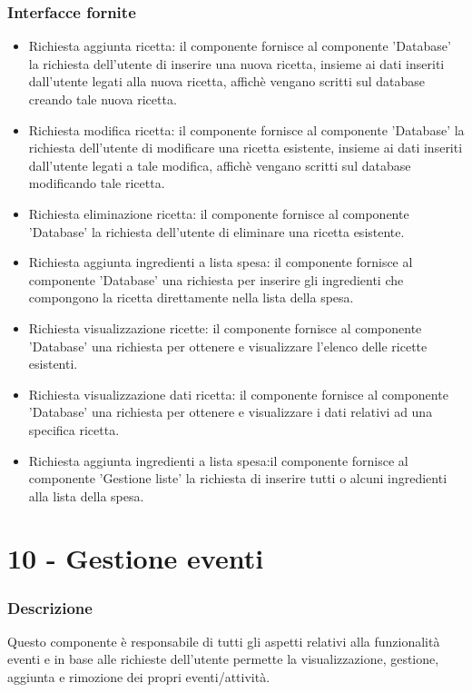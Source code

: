 \documentclass[a4paper,12pt]{article}
\begin{document}
\subsubsection*{Interfacce fornite}
\begin{itemize} \setlength\itemsep{0.01em}
\item {\sffamily Richiesta aggiunta ricetta}: il componente fornisce al componente 'Database' la richiesta dell'utente di inserire una nuova ricetta, insieme ai dati inseriti dall'utente legati alla nuova ricetta, affichè vengano scritti sul database creando tale nuova ricetta.
\item {\sffamily Richiesta modifica ricetta}: il componente fornisce al componente 'Database'  la richiesta dell'utente di modificare una ricetta esistente, insieme ai dati inseriti dall'utente legati a tale modifica, affichè vengano scritti sul database modificando tale ricetta.
\item {\sffamily Richiesta eliminazione ricetta}: il componente fornisce al componente 'Database'  la richiesta dell'utente di eliminare una ricetta esistente.
\item {\sffamily Richiesta aggiunta ingredienti a lista spesa}: il componente fornisce al componente 'Database' una richiesta per inserire gli ingredienti che compongono la ricetta direttamente nella lista della spesa.
\item {\sffamily Richiesta visualizzazione ricette}: il componente fornisce al componente 'Database' una richiesta per ottenere e visualizzare l'elenco delle ricette esistenti.
\item {\sffamily Richiesta visualizzazione dati ricetta}: il componente fornisce al componente 'Database' una richiesta per ottenere e visualizzare i dati relativi ad una specifica ricetta.
\item {\sffamily Richiesta aggiunta ingredienti a lista spesa}:il componente fornisce al componente 'Gestione liste' la richiesta di inserire tutti o alcuni ingredienti alla lista della spesa.
\end{itemize}



\section*{10 -  Gestione eventi}
\subsubsection*{Descrizione}
Questo componente è responsabile di tutti gli aspetti relativi alla funzionalità eventi e in base alle richieste dell'utente permette la visualizzazione, gestione, aggiunta e rimozione dei propri eventi/attività.
\end{document}

